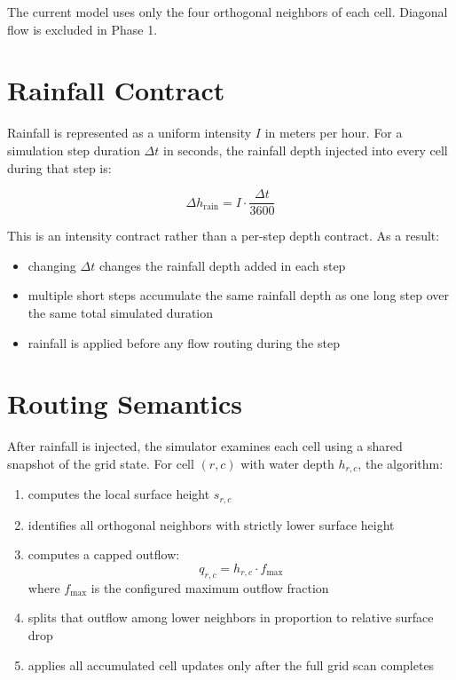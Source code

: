 \documentclass[10pt]{article}
\begin{document}
The current model uses only the four orthogonal neighbors of each cell. Diagonal flow is excluded in Phase 1.

\section{Rainfall Contract}

Rainfall is represented as a uniform intensity $I$ in meters per hour. For a simulation step duration $\Delta t$ in seconds, the rainfall depth injected into every cell during that step is:

\[
\Delta h_{\text{rain}} = I \cdot \frac{\Delta t}{3600}
\]

This is an intensity contract rather than a per-step depth contract. As a result:

\begin{itemize}
    \item changing $\Delta t$ changes the rainfall depth added in each step
    \item multiple short steps accumulate the same rainfall depth as one long step over the same total simulated duration
    \item rainfall is applied before any flow routing during the step
\end{itemize}

\section{Routing Semantics}

After rainfall is injected, the simulator examines each cell using a shared snapshot of the grid state. For cell $(r,c)$ with water depth $h_{r,c}$, the algorithm:

\begin{enumerate}
    \item computes the local surface height $s_{r,c}$
    \item identifies all orthogonal neighbors with strictly lower surface height
    \item computes a capped outflow:
    \[
    q_{r,c} = h_{r,c} \cdot f_{\max}
    \]
    where $f_{\max}$ is the configured maximum outflow fraction
    \item splits that outflow among lower neighbors in proportion to relative surface drop
    \item applies all accumulated cell updates only after the full grid scan completes
\end{enumerate}
\end{document}
